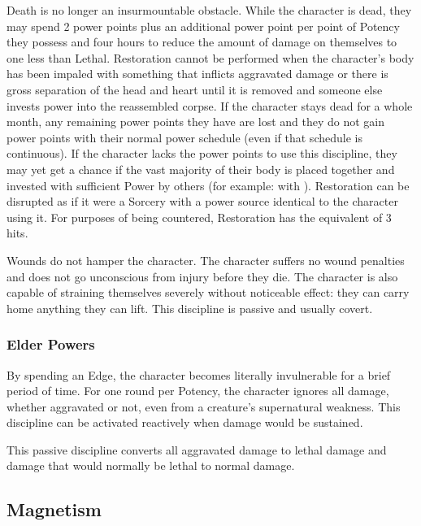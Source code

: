  Death is no longer an insurmountable obstacle. While the character is dead, they may spend 2 power points plus an additional power point per point of Potency they possess and four hours to reduce the amount of damage on themselves to one less than Lethal.  Restoration cannot be performed when the character's body has been impaled with something that inflicts aggravated damage or there is gross separation of the head and heart until it is removed and someone else invests power into the reassembled corpse. If the character stays dead for a whole month, any remaining power points they have are lost and they do not gain power points with their normal power schedule (even if that schedule is continuous). If the character lacks the power points to use this discipline, they may yet get a  chance if the vast majority of their body is placed together and invested with sufficient Power by others (for example: with ). Restoration can be disrupted as if it were a Sorcery with a power source identical to the character using it. For purposes of being countered, Restoration has the equivalent of 3 hits.

 Wounds do not hamper the character. The character suffers no wound penalties and does not go unconscious from injury before they die. The character is also capable of straining themselves severely without noticeable effect: they can carry home anything they can lift. This discipline is passive and usually covert.


\subsubsection{Elder Powers}

 By spending an Edge, the character becomes literally invulnerable for a brief period of time. For one round per Potency, the character ignores all damage, whether aggravated or not, even from a creature's supernatural weakness. This discipline can be activated reactively when damage would be sustained.

 This passive discipline converts all aggravated damage to lethal damage and damage that would normally be lethal to normal damage.



\subsection{Magnetism}


